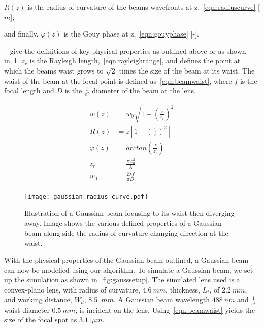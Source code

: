    \indent $R(z)$ is the radius of curvature of the beams wavefronts at z,~\cref{eqn:radiuscurve} [$m$];

    \indent and finally, $\varphi(z)$ is the Gouy phase at z,~\cref{eqn:gouyphase} [-].

\medskip

~ give the definitions of key physical properties as outlined above or as shown in~\cref{fig:gbeamills}. 
$z_r$ is the Rayleigh length,~\cref{eqn:rayleighrange}, and defines the point at which the beams waist grows to $\sqrt{2}$ times the size of the beam at its waist.
The waist of the beam at the focal point is defined as~\cref{eqn:beamwaist}, where $f$ is the focal length and $D$ is the $\tfrac{1}{e^2}$ diameter of the beam at the lens.

\begin{align}
    w(z) &= w_0\sqrt{1+\left(\frac{z}{z_r}\right)^2} \label{eqn:gwaist} \\
    R(z) &= z\left[1+\left(\frac{z_r}{z}\right)^2\right]\label{eqn:radiuscurve}\\
    \varphi(z) &= arctan\left(\frac{z}{z_r}\right)\label{eqn:gouyphase}\\
    z_r &= \frac{\pi w_0^2}{\lambda}\label{eqn:rayleighrange}\\
    w_0 &= \frac{2\lambda f}{\pi D}\label{eqn:beamwaist}\\
\end{align}

\begin{figure}[!ht]
    \centering
    \texttt{[image: gaussian-radius-curve.pdf]}
    \caption{Illustration of a Gaussian beam focusing to its waist then diverging away. Image shows the various defined properties of a Gaussian beam along side the radius of curvature changing direction at the waist.}
    \label{fig:gbeamills}
\end{figure}

With the physical properties of the Gaussian beam outlined, a Gaussian beam can now be modelled using our algorithm.
To simulate a Gaussian beam, we set up the simulation as shown in~\cref{fig:gausssetup}.
The simulated lens used is a convex-plano lens, with radius of curvature, $4.6~mm$, thickness, $L_t$, of $2.2~mm$, and working distance, $W_d$, 8.5~$mm$.
A Gaussian beam wavelength $488~nm$ and $\tfrac{1}{e^2}$ waist diameter $0.5~mm$, is incident on the lens.
Using~\cref{eqn:beamwaist} yields the size of the focal spot as $3.11\mu m$.

